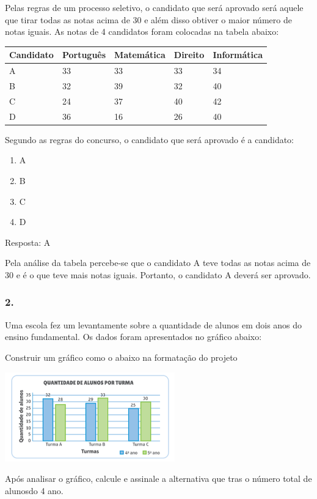 Pelas regras de um processo seletivo, o candidato que será aprovado será
aquele que tirar todas as notas acima de 30 e além disso obtiver o maior
número de notas iguais. As notas de 4 candidatos foram colocadas na
tabela abaixo:

\begin{longtable}[]{@{}lllll@{}}
\toprule
Candidato & Português & Matemática & Direito &
Informática\tabularnewline
\midrule
\endhead
A & 33 & 33 & 33 & 34\tabularnewline
B & 32 & 39 & 32 & 40\tabularnewline
C & 24 & 37 & 40 & 42\tabularnewline
D & 36 & 16 & 26 & 40\tabularnewline
\bottomrule
\end{longtable}

Segundo as regras do concurso, o candidato que será aprovado é a
candidato:

\begin{enumerate}
\def\labelenumi{\alph{enumi})}
\item
  A
\item
  B
\item
  C
\item
  D
\end{enumerate}

Resposta: A

Pela análise da tabela percebe-se que o candidato A teve todas as notas
acima de 30 e é o que teve mais notas iguais. Portanto, o candidato A
deverá ser aprovado.

\subsubsection{2.}\label{section-102}

Uma escola fez um levantamente sobre a quantidade de alunos em dois anos
do ensino fundamental. Os dados foram apresentados no gráfico abaixo:

Construir um gráfico como o abaixo na formatação do projeto

\includegraphics[width=2.89744in,height=1.52156in]{media/image104.png}

Após analisar o gráfico, calcule e assinale a alternativa que tras o
número total de alunosdo 4 ano.

